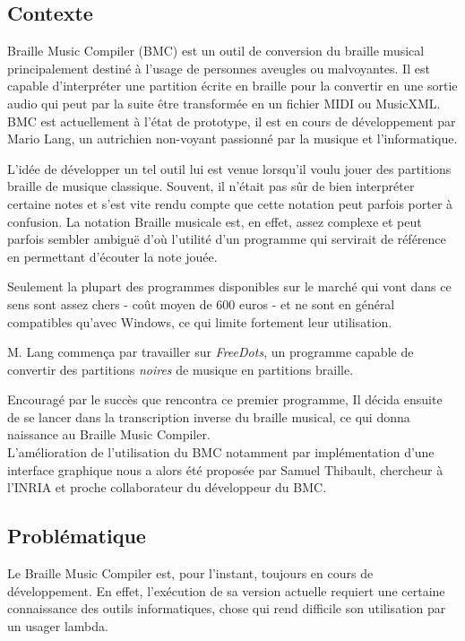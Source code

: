 \subsection*{Contexte}
Braille Music Compiler (BMC) est un outil de conversion du braille musical principalement destiné à l'usage de personnes aveugles ou malvoyantes. Il est capable d'interpréter une partition écrite en braille pour la convertir en une sortie audio qui peut par la suite être transformée en un fichier  MIDI ou MusicXML.\\

  BMC est actuellement à l'état de prototype, il est en cours de développement par Mario Lang, un autrichien non-voyant passionné par la musique et l'informatique.

  L'idée de développer un tel outil lui est venue lorsqu'il voulu jouer des partitions braille de musique classique. Souvent, il n'était pas sûr de bien interpréter certaine notes et s'est vite rendu compte que cette notation peut parfois porter à confusion. La notation Braille musicale est, en effet, assez complexe et peut parfois sembler ambiguë d'où l'utilité d'un programme qui servirait de référence en permettant d'écouter la note jouée. 
  
  Seulement la plupart des programmes disponibles sur le marché qui vont dans ce sens sont assez chers - coût moyen de 600 euros - et ne sont en général compatibles qu'avec Windows, ce qui limite fortement leur utilisation.
 
  M. Lang commença par travailler sur \textit{FreeDots}, un programme capable de convertir des partitions \textit{noires} de musique en partitions braille.

  Encouragé par le succès que rencontra ce premier programme, Il décida ensuite de se lancer dans la transcription inverse du braille musical, ce qui donna naissance au Braille Music Compiler. \\
  
  L'amélioration de l'utilisation du BMC notamment par implémentation d'une interface graphique nous a alors été proposée par Samuel Thibault, chercheur à l'INRIA et proche collaborateur du développeur du BMC. 
  
  
 
\subsection*{Problématique}
Le Braille Music Compiler est, pour l'instant, toujours en cours de développement. En effet, l'exécution de sa version actuelle requiert une certaine connaissance des outils informatiques, chose qui rend difficile son utilisation par un usager lambda.

